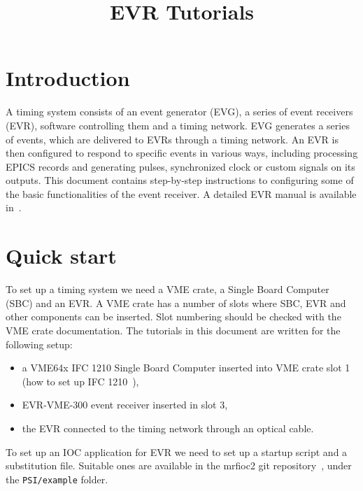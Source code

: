 \documentclass[12pt,a4paper]{article}
\title{EVR Tutorials}
\date{}
\begin{document}
\maketitle

\tableofcontents
\newpage

\section{Introduction}
A timing system consists of an event generator (EVG), a series of event receivers (EVR), software controlling them and a timing network. EVG generates a series of events, which are delivered to EVRs through a timing network. An EVR is then configured to respond to specific events in various ways, including processing EPICS records and generating pulses, synchronized clock or custom signals on its outputs.
This document contains step-by-step instructions to configuring some of the basic functionalities of the event receiver. A detailed EVR manual is available in~\cite{evr_manual}.

\section{Quick start}\label{sec:Quick start}
To set up a timing system we need a VME crate, a Single Board Computer (SBC) and an EVR. A VME crate has a number of slots where SBC, EVR and other components can be inserted. Slot numbering should be checked with the VME crate documentation. The tutorials in this document are written for the following setup:
\begin{itemize}
	\item a VME64x IFC 1210 Single Board Computer inserted into VME crate slot 1 (how to set up IFC 1210~\cite{ifc}),
	\item EVR-VME-300 event receiver inserted in slot 3,
	\item the EVR connected to the timing network through an optical cable.
\end{itemize}

To set up an IOC application for EVR we need to set up a startup script and a substitution file. Suitable ones are available in the mrfioc2 git repository~\cite{git_mrfioc2}, under the \texttt{PSI/example} folder.
\end{document}
